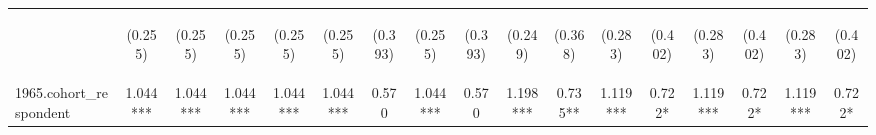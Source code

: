 \begin{center}
\begin{tabular}{lcccccccccccccccc}
\vspace{4pt} & \begin{footnotesize}(0.255)\end{footnotesize} & \begin{footnotesize}(0.255)\end{footnotesize} & \begin{footnotesize}(0.255)\end{footnotesize} & \begin{footnotesize}(0.255)\end{footnotesize} & \begin{footnotesize}(0.255)\end{footnotesize} & \begin{footnotesize}(0.393)\end{footnotesize} & \begin{footnotesize}(0.255)\end{footnotesize} & \begin{footnotesize}(0.393)\end{footnotesize} & \begin{footnotesize}(0.249)\end{footnotesize} & \begin{footnotesize}(0.368)\end{footnotesize} & \begin{footnotesize}(0.283)\end{footnotesize} & \begin{footnotesize}(0.402)\end{footnotesize} & \begin{footnotesize}(0.283)\end{footnotesize} & \begin{footnotesize}(0.402)\end{footnotesize} & \begin{footnotesize}(0.283)\end{footnotesize} & \begin{footnotesize}(0.402)\end{footnotesize} \\
1965.cohort\_respondent & 1.044*** & 1.044*** & 1.044*** & 1.044*** & 1.044*** & 0.570 & 1.044*** & 0.570 & 1.198*** & 0.735** & 1.119*** & 0.722* & 1.119*** & 0.722* & 1.119*** & 0.722* \\

\end{tabular}
\end{center}
